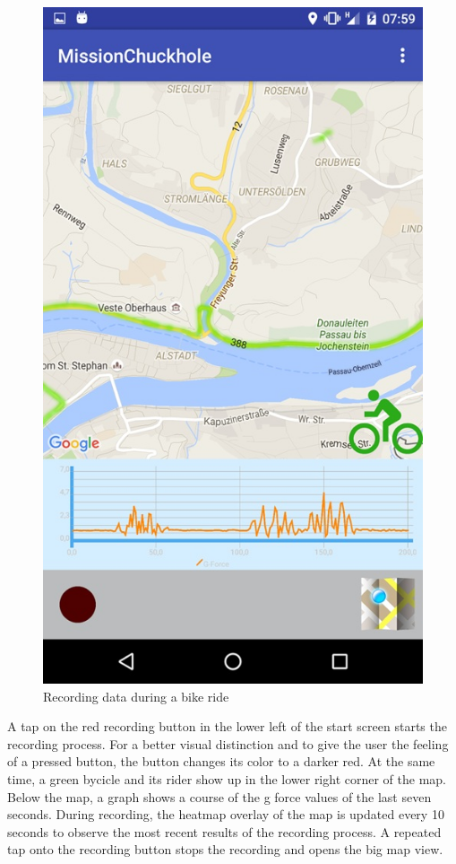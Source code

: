 \documentclass[10pt,a4paper]{article} %
\begin{document}
	\begin{figure}[H]
	  \centering
    	  \includegraphics[scale=0.4]{pic2}
    	  \caption{Recording data during a bike ride }
	  \label{fig:record_data}
    \end{figure}
\noindent
    	A tap on the red recording button in the lower left of the start screen starts the recording process.
    	For a better visual distinction and to give the user the feeling of a pressed button, the button changes its color to a darker red.
	At the same time, a green bycicle and its rider show up in the lower right corner of the map.
	Below the map, a graph shows a course of the g force values of the last seven seconds.
	During recording, the heatmap overlay of the map is updated every 10 seconds to observe the most recent results of the recording process.
	A repeated tap onto the recording button stops the recording and opens the big map view.
	
\end{document}
